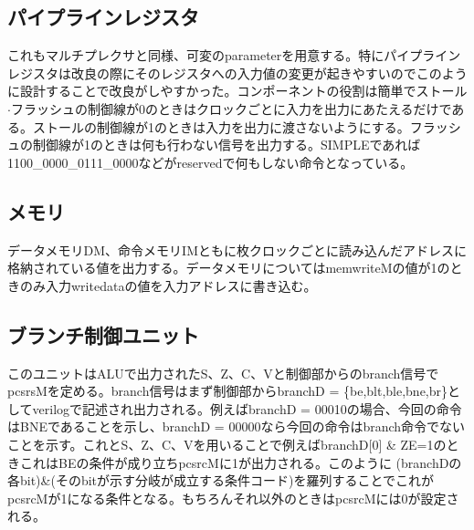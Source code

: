 \documentclass[a4paper,11pt,oneside,openany]{jsarticle}
\begin{document}
\subsection{パイプラインレジスタ}
これもマルチプレクサと同様、可変のparameterを用意する。特にパイプラインレジスタは改良の際にそのレジスタへの入力値の変更が起きやすいのでこのように設計することで改良がしやすかった。コンポーネントの役割は簡単でストール$\cdot$フラッシュの制御線が0のときはクロックごとに入力を出力にあたえるだけである。ストールの制御線が1のときは入力を出力に渡さないようにする。フラッシュの制御線が1のときは何も行わない信号を出力する。SIMPLEであれば1100\_0000\_0111\_0000などがreservedで何もしない命令となっている。
\subsection{メモリ}
データメモリDM、命令メモリIMともに枚クロックごとに読み込んだアドレスに格納されている値を出力する。データメモリについてはmemwriteMの値が1のときのみ入力writedataの値を入力アドレスに書き込む。
\subsection{ブランチ制御ユニット}
このユニットはALUで出力されたS、Z、C、Vと制御部からのbranch信号でpcsrsMを定める。branch信号はまず制御部からbranchD = \{be,blt,ble,bne,br\}としてverilogで記述され出力される。例えばbranchD = 00010の場合、今回の命令はBNEであることを示し、branchD = 00000なら今回の命令はbranch命令でないことを示す。これとS、Z、C、Vを用いることで例えばbranchD[0] \& ZE=1のときこれはBEの条件が成り立ちpcsrcMに1が出力される。このように (branchDの各bit)\&(そのbitが示す分岐が成立する条件コード)を羅列することでこれがpcsrcMが1になる条件となる。もちろんそれ以外のときはpcsrcMには0が設定される。
\end{document}
